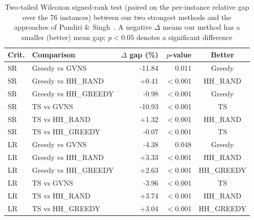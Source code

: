 \begin{table}[t]
\centering\small
\caption{Two-tailed Wilcoxon signed-rank test (paired on the per-instance relative gap over the 76 instances) between our two strongest methods and the approaches of Pandiri \& Singh~\cite{pandiri2020}. A negative $\Delta$ means our method has a smaller (better) mean gap; $p<0.05$ denotes a significant difference}
\label{tab:wilcoxon}
\begin{tabular}{llrrc}
\hline
Crit. & Comparison & $\Delta$ gap (\%) & $p$-value & Better \\
\hline
SR & Greedy vs GVNS & -11.84 & 0.011 & Greedy \\
SR & Greedy vs HH\_RAND & +0.41 & $<$0.001 & HH\_RAND \\
SR & Greedy vs HH\_GREEDY & -0.98 & $<$0.001 & Greedy \\
SR & TS vs GVNS & -10.93 & $<$0.001 & TS \\
SR & TS vs HH\_RAND & +1.32 & $<$0.001 & HH\_RAND \\
SR & TS vs HH\_GREEDY & -0.07 & $<$0.001 & TS \\
\hline
LR & Greedy vs GVNS & -4.38 & 0.048 & Greedy \\
LR & Greedy vs HH\_RAND & +3.33 & $<$0.001 & HH\_RAND \\
LR & Greedy vs HH\_GREEDY & +2.63 & $<$0.001 & HH\_GREEDY \\
LR & TS vs GVNS & -3.96 & $<$0.001 & TS \\
LR & TS vs HH\_RAND & +3.74 & $<$0.001 & HH\_RAND \\
LR & TS vs HH\_GREEDY & +3.04 & $<$0.001 & HH\_GREEDY \\
\hline
\end{tabular}
\end{table}
